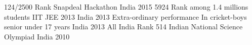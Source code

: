     \begin{cvhonors}
      \cvhonor
        { 124/2500 Rank}
        {Snapdeal Hackathon}
        {India}
        {2015}
      \cvhonor
        {5924 Rank among 1.4 millions students}
        {IIT JEE 2013}
        {India}
        {2013}
      \cvhonor
        {Extra-ordinary performance}
        {In cricket-boys senior under 17 years}
        {India}
        {2013}
      \cvhonor
        {{All India Rank} 514}
        {Indian National Science Olympiad}
        {India}
        {2010}
    \end{cvhonors}
